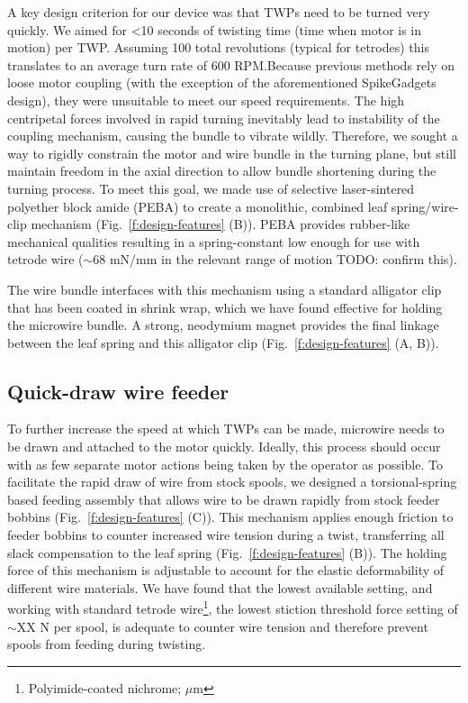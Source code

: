 \documentclass[11pt,a4paper]{article}
\begin{document}
A key design criterion for our device was that TWPs need to be turned very
quickly. We aimed for <10 seconds of twisting time (time when motor is in
motion) per TWP. Assuming 100 total revolutions (typical for tetrodes) this translates
to an average turn rate of 600 RPM.\@ Because previous methods rely on loose
motor coupling (with the exception of the aforementioned SpikeGadgets design),
they were unsuitable to meet our speed requirements. The high centripetal
forces involved in rapid turning inevitably lead to instability of the coupling
mechanism, causing the bundle to vibrate wildly. Therefore, we sought a way to
rigidly constrain the motor and wire bundle in the turning plane, but still
maintain freedom in the axial direction to allow bundle shortening during the
turning process. To meet this goal, we made use of selective laser-sintered
polyether block amide (PEBA) to create a monolithic, combined leaf
spring/wire-clip mechanism (Fig.~\ref{f:design-features} (B)). PEBA provides
rubber-like mechanical qualities resulting in a spring-constant low enough for
use with tetrode wire ($\sim$68 mN/mm in the relevant range of motion TODO:
confirm this).

The wire bundle interfaces with this mechanism using a standard alligator clip
that has been coated in shrink wrap, which we have found effective for holding
the microwire bundle. A strong, neodymium magnet provides the final linkage
between the leaf spring and this alligator clip (Fig.~\ref{f:design-features}
(A, B)).

\subsection{Quick-draw wire feeder}
To further increase the speed at which TWPs can be made, microwire needs to be
drawn and attached to the motor quickly. Ideally, this process should occur
with as few separate motor actions being taken by the operator as possible. To
facilitate the rapid draw of wire from stock spools, we designed a
torsional-spring based feeding assembly that allows wire to be drawn rapidly
from stock feeder bobbins (Fig.~\ref{f:design-features} (C)). This mechanism
applies enough friction to feeder bobbins to counter increased wire tension
during a twist, transferring all slack compensation to the leaf spring
(Fig.~\ref{f:design-features} (B)). The holding force of this mechanism is
adjustable to account for the elastic deformability of different wire
materials. We have found that the lowest available setting, and working with
standard tetrode wire\footnote{Polyimide-coated nichrome; $\mu$m}, the lowest stiction threshold force
setting of $\sim$XX N per spool, is adequate to counter wire tension and
therefore prevent spools from feeding during twisting.
\end{document}
